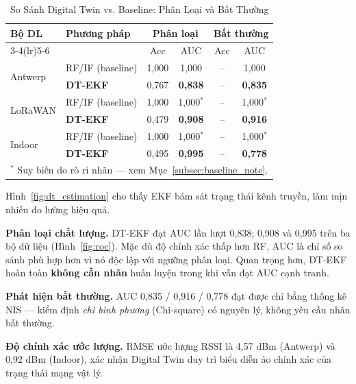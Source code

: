 \documentclass[12pt, a4paper]{article}
\begin{document}
\begin{table}[H]
\centering
\small
\caption{So Sánh Digital Twin vs. Baseline: Phân Loại và Bất Thường}
\label{tab:dt_results}
\begin{tabular}{llcccc}
\toprule
\multirow{2}{*}{\textbf{Bộ DL}} &
\multirow{2}{*}{\textbf{Phương pháp}} &
\multicolumn{2}{c}{\textbf{Phân loại}} &
\multicolumn{2}{c}{\textbf{Bất thường}} \\
\cmidrule(lr){3-4}\cmidrule(lr){5-6}
& & Acc & AUC & Acc & AUC \\
\midrule
\multirow{2}{*}{Antwerp}
  & RF/IF (baseline)       & 1,000 & 1,000         & -- & 1,000 \\
  & \textbf{DT-EKF}        & 0,767 & \textbf{0,838}& -- & \textbf{0,835} \\
\midrule
\multirow{2}{*}{LoRaWAN}
  & RF/IF (baseline)       & 1,000 & 1,000$^*$     & -- & 1,000$^*$ \\
  & \textbf{DT-EKF}        & 0,479 & \textbf{0,908}& -- & \textbf{0,916} \\
\midrule
\multirow{2}{*}{Indoor}
  & RF/IF (baseline)       & 1,000 & 1,000$^*$     & -- & 1,000$^*$ \\
  & \textbf{DT-EKF}        & 0,495 & \textbf{0,995}& -- & \textbf{0,778} \\
\midrule
\multicolumn{6}{l}{\footnotesize $^*$ Suy biến do rò rỉ \mbox{nhãn} --- xem Mục~\ref{subsec:baseline_note}.}\\
\bottomrule
\end{tabular}
\end{table}

Hình~\ref{fig:dt_estimation} cho thấy EKF bám sát trạng thái
kênh truyền, làm mịn nhiễu đo lường hiệu quả.

\textbf{Phân loại chất lượng.}
DT-EKF đạt AUC lần lượt 0,838; 0,908 và 0,995 trên ba bộ dữ liệu
(Hình~\ref{fig:roc}). Mặc dù độ chính xác thấp hơn RF, AUC là
chỉ số so sánh phù hợp hơn vì nó độc lập với ngưỡng phân loại.
Quan trọng hơn, DT-EKF hoàn toàn \textbf{không cần \mbox{nhãn}}
huấn luyện trong khi vẫn đạt AUC cạnh tranh.

\textbf{Phát hiện bất thường.}
AUC 0,835 / 0,916 / 0,778 đạt được chỉ bằng thống kê NIS ---
kiểm định \textit{chi bình phương} (Chi-square) có nguyên lý,
không yêu cầu \mbox{nhãn} bất thường.

\textbf{Độ chính xác ước lượng.}
RMSE ước lượng RSSI là 4,57 dBm (Antwerp) và 0,92 dBm (Indoor),
xác nhận Digital Twin duy trì biểu diễn ảo chính xác của trạng
thái mạng vật lý.
\end{document}

